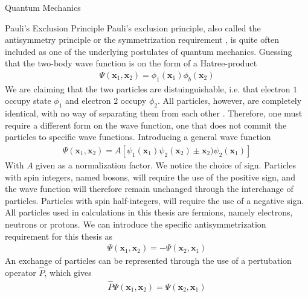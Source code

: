 \documentclass[twoside,english]{uiofysmaster}
\begin{document}
\begin{chapter}{Quantum Mechanics}
 	\begin{section}{Pauli's Exclusion Principle}
 		Pauli's exclusion principle, also called the antisymmetry principle or the symmetrization requirement \cite{Szabo,Griffiths}, is quite often included as one of the underlying postulates of quantum mechanics. Guessing that the two-body wave function is on the form of a Hatree-product
 		\begin{align}
 			\Psi(\mathbf{x}_1,\mathbf{x}_2) = \phi_1({\mathbf{x}_1}) \phi_b(\mathbf{x}_2)
 		\end{align}
 		We are claiming that the two particles are distuinguishable, i.e. that electron $1$ occupy state $\phi_1$ and electron $2$ occupy $\phi_2$. All particles, however, are completely identical, with no way of separating them from each other \cite{Griffiths}. Therefore, one must require a different form on the wave function, one that does not commit the particles to specific wave functions. Introducing a general wave function
 		\begin{align}
 			\Psi(\mathbf{x}_1,\mathbf{x}_2) = A[\psi_1(\mathbf{x}_1) \psi_2(\mathbf{x}_2) \pm \mathbf{x}_2) \psi_2(\mathbf{x}_1)]
 		\end{align}
 		With $A$ given as a normalization factor. We notice the choice of sign. Particles with spin integers, named bosons, will require the use of the positive sign, and the wave function will therefore remain unchanged through the interchange of particles. Particles with spin half-integers, will require the use of a negative sign. All particles used in calculations in this thesis are fermions, namely electrons, neutrons or protons. We can introduce the specific antisymmetrization requirement for this thesis as
 		\begin{align}
 			\Psi(\mathbf{x}_1,\mathbf{x}_2) = -\Psi(\mathbf{x}_2,\mathbf{x}_1)
 		\end{align}
 		An exchange of particles can be represented through the use of a pertubation operator $\hat P$, which gives 
 		\begin{align}
 			\hat P \Psi(\mathbf{x}_1,\mathbf{x}_2) = \Psi(\mathbf{x}_2,\mathbf{x}_1)
 		\end{align}
 	\end{section}


\end{chapter}
\end{document}
